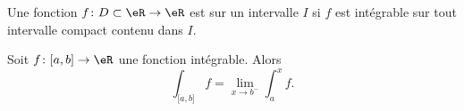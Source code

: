 
\begin{definition}
    Une fonction \( f\colon D\subset\eR\to \eR\) est  sur un intervalle \( I\) si \( f\) est intégrable sur tout intervalle compact contenu dans \( I\).
\end{definition}


\begin{proposition}     \label{PropCJAooQhNYkp}
    Soit \( f\colon \mathopen[ a , b \mathclose]\to \eR\) une fonction intégrable. Alors
    \begin{equation}    \label{EqPPMooBQDTYl}
        \int_{\mathopen[ a , b \mathclose]}f=\lim_{x\to b^-} \int_a^xf.
    \end{equation}
\end{proposition}

